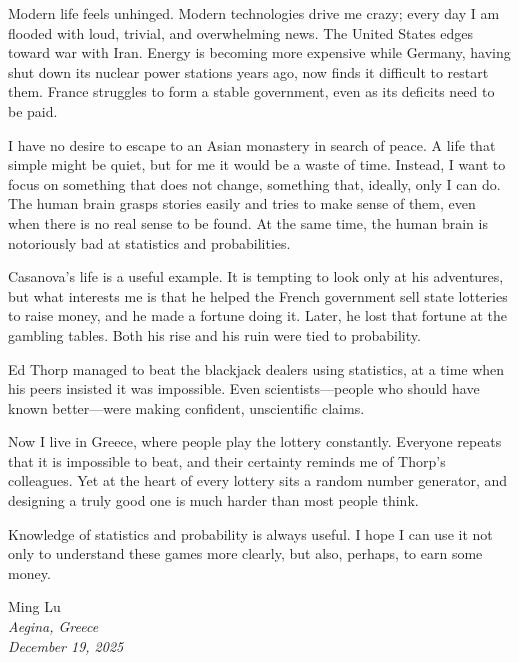 Modern life feels unhinged. Modern technologies drive me crazy; every day I am flooded with loud, trivial, and overwhelming news. The United States edges toward war with Iran. Energy is becoming more expensive while Germany, having shut down its nuclear power stations years ago, now finds it difficult to restart them. France struggles to form a stable government, even as its deficits need to be paid.

I have no desire to escape to an Asian monastery in search of peace. A life that simple might be quiet, but for me it would be a waste of time. Instead, I want to focus on something that does not change, something that, ideally, only I can do. The human brain grasps stories easily and tries to make sense of them, even when there is no real sense to be found. At the same time, the human brain is notoriously bad at statistics and probabilities.

Casanova’s life is a useful example. It is tempting to look only at his adventures, but what interests me is that he helped the French government sell state lotteries to raise money, and he made a fortune doing it. Later, he lost that fortune at the gambling tables. Both his rise and his ruin were tied to probability.

Ed Thorp managed to beat the blackjack dealers using statistics, at a time when his peers insisted it was impossible. Even scientists—people who should have known better—were making confident, unscientific claims.

Now I live in Greece, where people play the lottery constantly. Everyone repeats that it is impossible to beat, and their certainty reminds me of Thorp’s colleagues. Yet at the heart of every lottery sits a random number generator, and designing a truly good one is much harder than most people think.

Knowledge of statistics and probability is always useful. I hope I can use it not only to understand these games more clearly, but also, perhaps, to earn some money.

\vspace{2em}
\begin{flushright}
Ming Lu\\
\emph{Aegina, Greece}\\
\emph{December 19, 2025}
\end{flushright}

